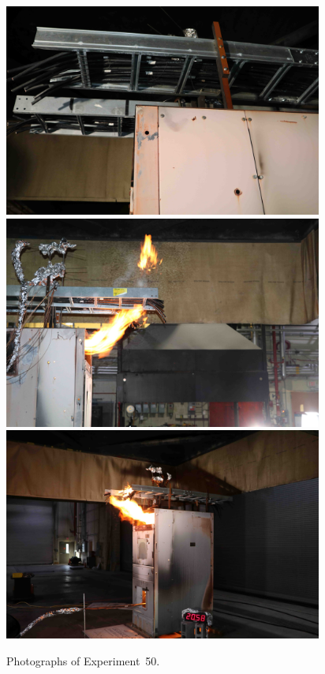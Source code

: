 \documentclass[12pt]{article}
\begin{document}
\begin{figure}[p]
\centering
\includegraphics[height=2.75in]{../FIGURES/Test_50_cables} \\
\includegraphics[height=2.75in]{../FIGURES/Test_50_side} \\
\includegraphics[height=2.75in]{../FIGURES/Test_50_20_min_58_s}
\caption[Photographs of Experiment~50]{Photographs of Experiment~50.}
\label{fig:Test_50_photos}
\end{figure}


\clearpage
\end{document}
